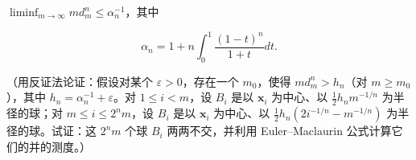 \(\liminf_{m \to \infty} md_m^n \leqslant \alpha_n^{-1}\)，其中

\[
\alpha_ {n} = 1 + n \int_ {0} ^ {1} \frac {(1 - t) ^ {n}}{1 + t} d t.
\]

（用反证法论证：假设对某个 \(\varepsilon > 0\)，存在一个 \(m_0\)，使得 \(md_m^n > h_n\)（对 \(m \geqslant m_0\)），其中 \(h_n = \alpha_n^{-1} + \varepsilon\)。对 \(1 \leqslant i < m\)，设 \(B_i\) 是以 \(\mathbf{x}_i\) 为中心、以 \(\frac{1}{2} h_n m^{-1/n}\) 为半径的球；对 \(m \leqslant i \leqslant 2^n m\)，设 \(B_i\) 是以 \(\mathbf{x}_i\) 为中心、以 \(\frac{1}{2} h_n (2i^{-1/n} - m^{-1/n})\) 为半径的球。试证：这 \(2^n m\) 个球 \(B_i\) 两两不交，并利用 Euler--Maclaurin 公式计算它们的并的测度。）
\relax{}
\setcounter{exercisegroup}{5}
\edef\CurrentExerciseGroup{\arabic{exercisegroup}}
